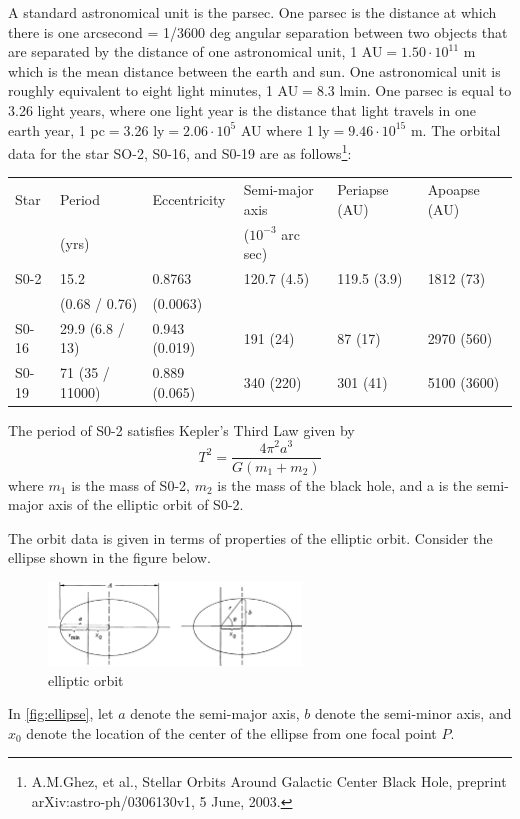 \documentclass[solutions]{esg8012pset}
\begin{document}
    A standard astronomical unit is the parsec. One parsec is the distance at which there is one arcsecond = 1/3600 deg angular separation between two objects that are separated by the distance of one astronomical unit, 1 AU${} = 1.50 \cdot 10^{11}$ m which is the mean distance between the earth and sun. One astronomical unit is roughly equivalent to eight light minutes,  1 AU${} = 8.3$ lmin.  One parsec is equal to 3.26 light years, where one light year is the distance that light travels in one earth year, 1 pc${} = {}$3.26 ly${} = 2.06 \cdot 10^5$ AU where 1 ly${} = 9.46 \cdot 10^{15}$ m. The orbital data for the star SO-2, S0-16, and S0-19 are as follows\footnote{A.M.Ghez, et al., Stellar Orbits Around Galactic Center Black Hole, preprint arXiv:astro-ph/0306130v1, 5 June, 2003.}:
    \begin{center}
      \begin{tabular}{|l|l|l|l|l|l|}
        \hline Star  & Period          & Eccentricity  & Semi-major axis     & Periapse (AU) & Apoapse (AU) \\
                     & (yrs)           &               & ($10^{-3}$ arc sec) &               &              \\
        \hline S0-2  & 15.2            & 0.8763        & 120.7 (4.5)         & 119.5 (3.9)   & 1812 (73)    \\
                     & (0.68 / 0.76)   & (0.0063)      &                     &               &              \\
        \hline S0-16 & 29.9 (6.8 / 13) & 0.943 (0.019) & 191 (24)            & 87 (17)       & 2970 (560)   \\
        \hline S0-19 & 71 (35 / 11000) & 0.889 (0.065) & 340 (220)           & 301 (41)      & 5100 (3600)  \\ \hline
      \end{tabular}
    \end{center}
    The period of S0-2 satisfies Kepler's Third Law given by
    $$T^2 = \frac{4\pi^2 a^3}{G(m_1 + m_2)}$$
    where $m_1$ is the mass of S0-2, $m_2$ is the mass of the black hole, and a is the semi-major axis of the elliptic orbit of S0-2.

    The orbit data is given in terms of properties of the elliptic orbit. Consider the ellipse shown in the figure below.
    \begin{figure}[!h]
      \begin{center}\includegraphics[width=0.6\textwidth]{ps10_5}\end{center}
      \caption{elliptic orbit} \label{fig:ellipse}
    \end{figure}
    In \autoref{fig:ellipse}, let $a$ denote the semi-major axis, $b$ denote the semi-minor axis, and $x_0$ denote the location of the center of the ellipse from one focal point $P$.
\end{document}
